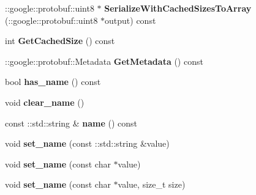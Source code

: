 \begin{DoxyCompactItemize}
\item 
\hypertarget{classSimpleChat_1_1UserListRequest_af63977cae9aadb450b821d0c00036318}{\-::google\-::protobuf\-::uint8 $\ast$ {\bfseries Serialize\-With\-Cached\-Sizes\-To\-Array} (\-::google\-::protobuf\-::uint8 $\ast$output) const }\label{classSimpleChat_1_1UserListRequest_af63977cae9aadb450b821d0c00036318}

\item 
\hypertarget{classSimpleChat_1_1UserListRequest_a1ae199d9572780890df4bee08fef3959}{int {\bfseries Get\-Cached\-Size} () const }\label{classSimpleChat_1_1UserListRequest_a1ae199d9572780890df4bee08fef3959}

\item 
\hypertarget{classSimpleChat_1_1UserListRequest_adc8b33d4656f7522f94983067ca16b43}{\-::google\-::protobuf\-::\-Metadata {\bfseries Get\-Metadata} () const }\label{classSimpleChat_1_1UserListRequest_adc8b33d4656f7522f94983067ca16b43}

\item 
\hypertarget{classSimpleChat_1_1UserListRequest_ac39ea97fec23807d645941cd53bfa829}{bool {\bfseries has\-\_\-name} () const }\label{classSimpleChat_1_1UserListRequest_ac39ea97fec23807d645941cd53bfa829}

\item 
\hypertarget{classSimpleChat_1_1UserListRequest_a88fa57a473361057130a06c6800a4e44}{void {\bfseries clear\-\_\-name} ()}\label{classSimpleChat_1_1UserListRequest_a88fa57a473361057130a06c6800a4e44}

\item 
\hypertarget{classSimpleChat_1_1UserListRequest_ac7142602df9da26b6389ff8e3589ec52}{const \-::std\-::string \& {\bfseries name} () const }\label{classSimpleChat_1_1UserListRequest_ac7142602df9da26b6389ff8e3589ec52}

\item 
\hypertarget{classSimpleChat_1_1UserListRequest_ab4121777eaff10296aba202da8096c22}{void {\bfseries set\-\_\-name} (const \-::std\-::string \&value)}\label{classSimpleChat_1_1UserListRequest_ab4121777eaff10296aba202da8096c22}

\item 
\hypertarget{classSimpleChat_1_1UserListRequest_acfd5a4349dbba982f9d2676ed1be3b73}{void {\bfseries set\-\_\-name} (const char $\ast$value)}\label{classSimpleChat_1_1UserListRequest_acfd5a4349dbba982f9d2676ed1be3b73}

\item 
\hypertarget{classSimpleChat_1_1UserListRequest_abb88a919eff5c37118cd5b085e2859e0}{void {\bfseries set\-\_\-name} (const char $\ast$value, size\-\_\-t size)}\label{classSimpleChat_1_1UserListRequest_abb88a919eff5c37118cd5b085e2859e0}


\end{DoxyCompactItemize}
